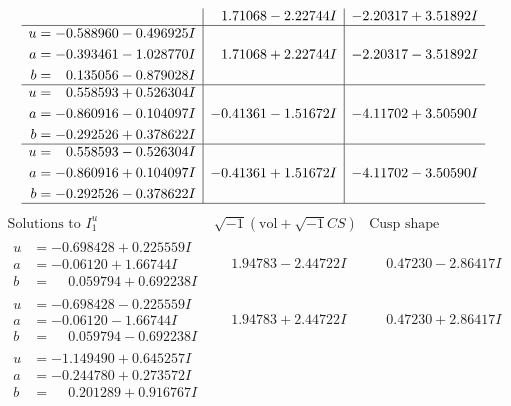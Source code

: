 \documentclass[1p]{elsarticle_modified}
\theoremstyle{definition}
\newcommand{\I}{\sqrt{-1}}
\begin{document}
$$\begin{array}{c|c|c}
 & \phantom{-}1.71068 - 2.22744 I & -2.20317 + 3.51892 I \\ \hline\begin{aligned}
u &= -0.588960 - 0.496925 I \\
a &= -0.393461 - 1.028770 I \\
b &= \phantom{-}0.135056 - 0.879028 I\end{aligned}
 & \phantom{-}1.71068 + 2.22744 I & -2.20317 - 3.51892 I \\ \hline\begin{aligned}
u &= \phantom{-}0.558593 + 0.526304 I \\
a &= -0.860916 - 0.104097 I \\
b &= -0.292526 + 0.378622 I\end{aligned}
 & -0.41361 - 1.51672 I & -4.11702 + 3.50590 I \\ \hline\begin{aligned}
u &= \phantom{-}0.558593 - 0.526304 I \\
a &= -0.860916 + 0.104097 I \\
b &= -0.292526 - 0.378622 I\end{aligned}
 & -0.41361 + 1.51672 I & -4.11702 - 3.50590 I\\
 \hline 
 \end{array}$$\newpage$$\begin{array}{c|c|c}  
\text{Solutions to }I^u_{1}& \I (\text{vol} + \sqrt{-1}CS) & \text{Cusp shape}\\
 \hline 
\begin{aligned}
u &= -0.698428 + 0.225559 I \\
a &= -0.06120 + 1.66744 I \\
b &= \phantom{-}0.059794 + 0.692238 I\end{aligned}
 & \phantom{-}1.94783 - 2.44722 I & \phantom{-}0.47230 - 2.86417 I \\ \hline\begin{aligned}
u &= -0.698428 - 0.225559 I \\
a &= -0.06120 - 1.66744 I \\
b &= \phantom{-}0.059794 - 0.692238 I\end{aligned}
 & \phantom{-}1.94783 + 2.44722 I & \phantom{-}0.47230 + 2.86417 I \\ \hline\begin{aligned}
u &= -1.149490 + 0.645257 I \\
a &= -0.244780 + 0.273572 I \\
b &= \phantom{-}0.201289 + 0.916767 I\end{aligned}

\end{array}$$
\end{document}
